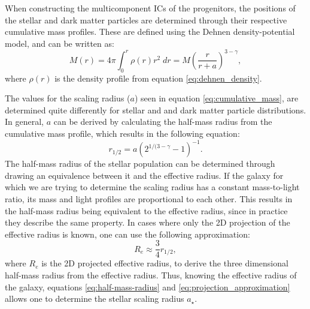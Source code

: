 \documentclass[english, oneside]{HYgradu}
\begin{document}
When constructing the multicomponent ICs of the progenitors, the positions of the stellar and dark matter particles are determined through their respective cumulative mass profiles. These are defined using the Dehnen density-potential model, and can be written as:
\begin{equation}
M(r) = 4\pi \int^r_0 \rho(r)r^2 \;dr = M \left( \frac{r}{r+a} \right)^{3-\gamma}, \label{eq:cumulative_mass}
\end{equation}
where $\rho(r)$ is the density profile from equation \ref{eq:dehnen_density}.

The values for the scaling radius ($a$) seen in equation \ref{eq:cumulative_mass}, are determined quite differently for stellar and and dark matter particle distributions. In general, $a$ can be derived by calculating the half-mass radius from the cumulative mass profile, which results in the following equation:
\begin{equation}
r_{1/2} = a \left( 2^{1/(3-\gamma}-1 \right)^{-1}. \label{eq:half-mass-radius}
\end{equation}
The half-mass radius of the stellar population can be determined through drawing an equivalence between it and the effective radius. If the galaxy for which we are trying to determine the scaling radius has a constant mass-to-light ratio, its mass and light profiles are proportional to each other. This results in the half-mass radius being equivalent to the effective radius, since in practice they describe the same property. In cases where only the 2D projection of the effective radius is known, one can use the following approximation:
\begin{equation}
R_e \approx \frac{3}{4} r_{1/2}, \label{eq:projection_approximation}
\end{equation} 
where $R_e$ is the 2D projected effective radius, to derive the three dimensional half-mass radius from the effective radius. Thus, knowing the effective radius of the galaxy, equations \ref{eq:half-mass-radius} and \ref{eq:projection_approximation} allows one to determine the stellar scaling radius $a_\star$.
\end{document}
